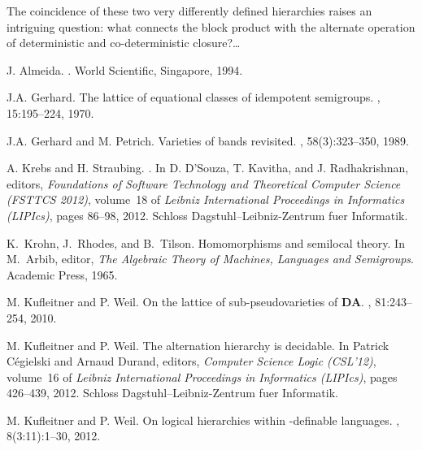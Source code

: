 \documentclass{llncs}
\begin{document}
The coincidence of these two very differently defined hierarchies raises an intriguing question: what connects the block product with the alternate operation of deterministic and co-deterministic closure?\dots






\begin{thebibliography}{10}

J. Almeida.
.
\newblock World Scientific, Singapore, 1994.

J.A. Gerhard.
\newblock The lattice of equational classes of idempotent semigroups.
, 15:195--224, 1970.

J.A. Gerhard and M. Petrich.
\newblock Varieties of bands revisited.
, 58(3):323--350,
  1989.

A. Krebs and H. Straubing.
.
\newblock In D. D'Souza, T. Kavitha, and J. Radhakrishnan,
  editors, {\em Foundations of Software Technology
  and Theoretical Computer Science (FSTTCS 2012)}, volume~18 of {\em Leibniz
  International Proceedings in Informatics (LIPIcs)}, pages 86--98, 2012. Schloss Dagstuhl--Leibniz-Zentrum fuer Informatik.

K.~Krohn, J.~Rhodes, and B.~Tilson.
\newblock Homomorphisms and semilocal theory.
\newblock In M.~Arbib, editor, {\em The Algebraic Theory of Machines, Languages
  and Semigroups}. Academic Press, 1965.

M. Kuf\-leitner and P. Weil.
\newblock On the lattice of sub-pseudovarieties of \textbf{DA}.
, 81:243--254, 2010.

M. Kuf\-leitner and P. Weil.
\newblock The  alternation hierarchy is decidable.
\newblock In Patrick C{\'e}gielski and Arnaud Durand, editors, {\em Computer
  Science Logic (CSL'12)}, volume~16 of {\em Leibniz International Proceedings in
  Informatics (LIPIcs)}, pages 426--439, 2012. Schloss
  Dagstuhl--Leibniz-Zentrum fuer Informatik.

M. Kuf\-leitner and P. Weil.
\newblock On logical hierarchies within -definable languages.
, 8(3:11):1--30, 2012.


\end{thebibliography}
\end{document}
